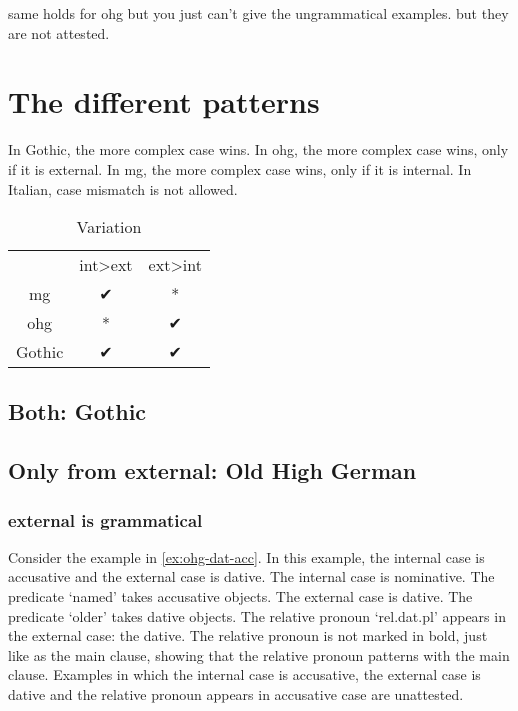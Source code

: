 same holds for \ac{ohg} but you just can't give the ungrammatical examples. but they are not attested.



\section{The different patterns}

In Gothic, the more complex case wins.
In \ac{ohg}, the more complex case wins, only if it is external.
In \ac{mg}, the more complex case wins, only if it is internal.
In Italian, case mismatch is not allowed.


\begin{table}[H]
	\center
	\caption {Variation}
		\begin{tabular}{ccc}
		\toprule
		 					& \ac{int}>\ac{ext}		& \ac{ext}>\ac{int}	\\
								\cmidrule{2-3}
		\ac{mg} 	& ✔			 							&	*									\\
		\ac{ohg}	& *										&	✔									\\
		Gothic		&	✔										&	✔									\\
		\bottomrule
		\end{tabular}
\end{table}



\subsection{Both: Gothic}









 \subsection{Only from external: Old High German}


  \subsubsection{external is grammatical}


Consider the example in \ref{ex:ohg-dat-acc}. In this example, the internal case is accusative and the external case is dative.
The internal case is nominative. The predicate  `named' takes accusative objects.
The external case is dative. The predicate  `older' takes dative objects.
The relative pronoun  `\ac{rel}.\ac{dat}.\ac{pl}' appears in the external case: the dative. The relative pronoun is not marked in bold, just like as the main clause, showing that the relative pronoun patterns with the main clause.
Examples in which the internal case is accusative, the external case is dative and the relative pronoun appears in accusative case are unattested.

